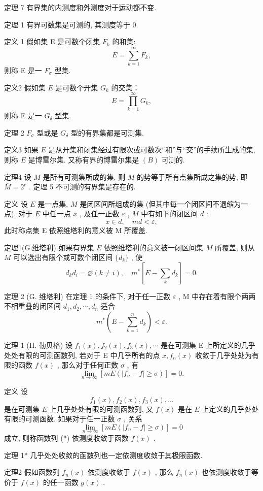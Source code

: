 \documentclass[]{article}
\begin{document}
定理 7 有界集的内测度和外测度对于运动都不变. 

定理 1 有界可数集是可测的, 其测度等于 0. 

定义 1 假如集 E 是可数个闭集 $F_{k}$ 的和集: $$
E = \sum_ {k = 1} ^ {\infty} F _ {k},
$$则称 E 是一 $F_{\sigma}$ 型集. 

定义2 假如集 $E$ 是可数个开集 $G_{k}$ 的交集：$$
E = \prod_ {k = 1} ^ {\infty} G _ {k},
$$ 则称 E 是一 $G_{\delta}$ 型集. 

定理 2 $F_{\sigma}$ 型或是 $G_{\delta}$ 型的有界集都是可测集. 

定义3 如果 $E$ 是从开集和闭集经过有限次或可数次“和”与“交”的手续所生成的集, 则称 $E$ 是博雷尔集. 又称有界的博雷尔集是 $(B)$ 可测的. 

定理4 设 $M$ 是所有可测集所成的集, 则 $M$ 的势等于所有点集所成之集的势, 即 $\overline{M} = 2^c$ . 
定理 5 不可测的有界集是存在的. 

定义 设 $E$ 是一点集, $M$ 是闭区间所组成的集 (但其中每一个闭区间不退缩为一点). 对于 $E$ 中任一点 $x$ , 及任一正数 $\varepsilon$ , $M$ 中有如下的闭区间 $d$ : $$
x \in d, \quad m d <   \varepsilon ,
$$此时称点集 E 依照维塔利的意义被 M 所覆盖. 

定理1(G.维塔利) 如果有界集 $E$ 依照维塔利的意义被一闭区间集 $M$ 所覆盖, 则从 $M$ 可以选出有限个或可数个闭区间 $\{d_k\}$ , 使 $$
d _ {k} d _ {i} = \varnothing (k \neq i), \quad m ^ {*} \left[ E - \sum_ {k} d _ {k} \right] = 0.
$$

定理 2 (G. 维塔利) 在定理 1 的条件下, 对于任一正数 $\varepsilon$ , M 中存在着有限个两两不相重叠的闭区间 $d_{1}, d_{2}, \cdots, d_{n}$ 适合 $$
m ^ {*} \left(E - \sum_ {k = 1} ^ {n} d _ {k}\right) <   \varepsilon .
$$

定理 1 (H. 勒贝格) 设 $f_{1}(x), f_{2}(x), f_{3}(x), \cdots$ 是在可测集 E 上所定义的几乎处处有限的可测函数列, 若对于 E 中几乎所有的点 $x, f_{n}(x)$ 收敛于几乎处处为有限的函数 $f(x)$ , 那么对于任何正数 $\sigma$ , 有$$
\lim _ {n \rightarrow \infty} [ m E (| f _ {n} - f | \geqslant \sigma) ] = 0.
$$

定义 设 $$
f _ {1} (x), f _ {2} (x), f _ {3} (x), \dots \tag {*}
$$ 是在可测集 $E$ 上几乎处处有限的可测函数列, 又 $f(x)$ 是在 $E$ 上定义的几乎处处有限的可测函数. 如果对于任一正数 $\sigma$ , 关系 $$
\lim _ {n \rightarrow \infty} [ m E (| f _ {n} - f | \geqslant \sigma) ] = 0
$$成立, 则称函数列 (*) 依测度收敛于函数 $f(x)$ . 

定理 1* 几乎处处收敛的函数列也一定依测度收敛于其极限函数. 

定理2 假如函数列 $f_{n}(x)$ 依测度收敛于 $f(x)$ , 那么 $f_{n}(x)$ 也依测度收敛于等价于 $f(x)$ 的任一函数 $g(x)$ . 
\end{document}
